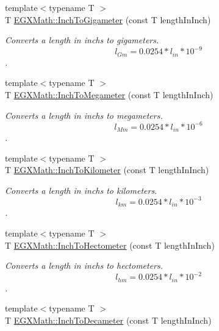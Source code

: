 \begin{DoxyCompactItemize}
{\footnotesize template$<$typename T $>$ }\\T \mbox{\hyperlink{group___e_g_x_math-_conversions-_length_conversions-_imperial-_inch-_s_i_gaf273646afbc5959590e89febab1a04ec}{E\+G\+X\+Math\+::\+Inch\+To\+Gigameter}} (const T length\+In\+Inch)
\begin{DoxyCompactList}\small\item\em Converts a length in inchs to gigameters. \[ l_{Gm}=0.0254 * l_{in} * 10^{-9} \]. \end{DoxyCompactList}\item 
{\footnotesize template$<$typename T $>$ }\\T \mbox{\hyperlink{group___e_g_x_math-_conversions-_length_conversions-_imperial-_inch-_s_i_ga338a079a2861293f873274e82d140e14}{E\+G\+X\+Math\+::\+Inch\+To\+Megameter}} (const T length\+In\+Inch)
\begin{DoxyCompactList}\small\item\em Converts a length in inchs to megameters. \[ l_{Mm}=0.0254 * l_{in} * 10^{-6} \]. \end{DoxyCompactList}\item 
{\footnotesize template$<$typename T $>$ }\\T \mbox{\hyperlink{group___e_g_x_math-_conversions-_length_conversions-_imperial-_inch-_s_i_ga8764c195dc365ed698383a0e59be1444}{E\+G\+X\+Math\+::\+Inch\+To\+Kilometer}} (const T length\+In\+Inch)
\begin{DoxyCompactList}\small\item\em Converts a length in inchs to kilometers. \[ l_{km}=0.0254 * l_{in} * 10^{-3} \]. \end{DoxyCompactList}\item 
{\footnotesize template$<$typename T $>$ }\\T \mbox{\hyperlink{group___e_g_x_math-_conversions-_length_conversions-_imperial-_inch-_s_i_ga2a991ddc6bcdb83749833f8075eb8cdb}{E\+G\+X\+Math\+::\+Inch\+To\+Hectometer}} (const T length\+In\+Inch)
\begin{DoxyCompactList}\small\item\em Converts a length in inchs to hectometers. \[ l_{hm}=0.0254 * l_{in} * 10^{-2} \]. \end{DoxyCompactList}\item 
{\footnotesize template$<$typename T $>$ }\\T \mbox{\hyperlink{group___e_g_x_math-_conversions-_length_conversions-_imperial-_inch-_s_i_ga84fad3dadf96d1f96530fb0e5fe8fca1}{E\+G\+X\+Math\+::\+Inch\+To\+Decameter}} (const T length\+In\+Inch)

\end{DoxyCompactItemize}
